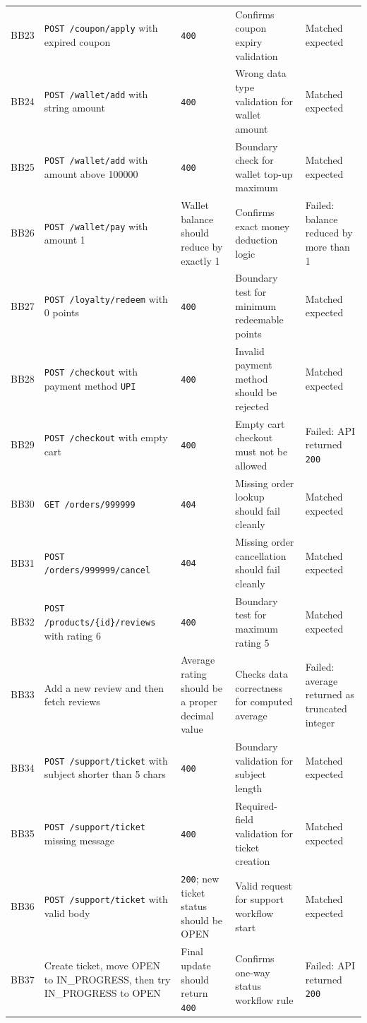 \documentclass[12pt]{article}
\begin{document}
\begin{longtable}{p{}p{}p{}p{}p{}}
BB23 & \texttt{POST /coupon/apply} with expired coupon & \texttt{400} & Confirms coupon expiry validation & Matched expected \\
BB24 & \texttt{POST /wallet/add} with string amount & \texttt{400} & Wrong data type validation for wallet amount & Matched expected \\
BB25 & \texttt{POST /wallet/add} with amount above 100000 & \texttt{400} & Boundary check for wallet top-up maximum & Matched expected \\
BB26 & \texttt{POST /wallet/pay} with amount 1 & Wallet balance should reduce by exactly 1 & Confirms exact money deduction logic & Failed: balance reduced by more than 1 \\
BB27 & \texttt{POST /loyalty/redeem} with 0 points & \texttt{400} & Boundary test for minimum redeemable points & Matched expected \\
BB28 & \texttt{POST /checkout} with payment method \texttt{UPI} & \texttt{400} & Invalid payment method should be rejected & Matched expected \\
BB29 & \texttt{POST /checkout} with empty cart & \texttt{400} & Empty cart checkout must not be allowed & Failed: API returned \texttt{200} \\
BB30 & \texttt{GET /orders/999999} & \texttt{404} & Missing order lookup should fail cleanly & Matched expected \\
BB31 & \texttt{POST /orders/999999/cancel} & \texttt{404} & Missing order cancellation should fail cleanly & Matched expected \\
BB32 & \texttt{POST /products/\{id\}/reviews} with rating 6 & \texttt{400} & Boundary test for maximum rating 5 & Matched expected \\
BB33 & Add a new review and then fetch reviews & Average rating should be a proper decimal value & Checks data correctness for computed average & Failed: average returned as truncated integer \\
BB34 & \texttt{POST /support/ticket} with subject shorter than 5 chars & \texttt{400} & Boundary validation for subject length & Matched expected \\
BB35 & \texttt{POST /support/ticket} missing message & \texttt{400} & Required-field validation for ticket creation & Matched expected \\
BB36 & \texttt{POST /support/ticket} with valid body & \texttt{200}; new ticket status should be OPEN & Valid request for support workflow start & Matched expected \\
BB37 & Create ticket, move OPEN to IN\_PROGRESS, then try IN\_PROGRESS to OPEN & Final update should return \texttt{400} & Confirms one-way status workflow rule & Failed: API returned \texttt{200} \\

\end{longtable}
\end{document}
